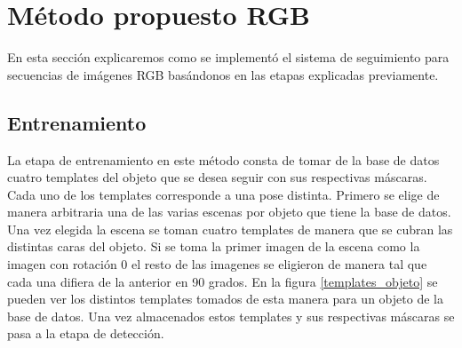 \section{Método propuesto RGB}\label{metodo_rgb}
En esta sección explicaremos como se implementó el sistema de seguimiento para secuencias de imágenes RGB basándonos en las etapas explicadas previamente.

\subsection{Entrenamiento}
La etapa de entrenamiento en este método consta de tomar de la base de datos cuatro templates del objeto que se desea seguir con sus respectivas máscaras. Cada uno de los templates corresponde a una pose distinta. Primero se elige de manera arbitraria una de las varias escenas por objeto que tiene la base de datos. Una vez elegida la escena se toman cuatro templates de manera que se cubran las distintas caras del objeto. Si se toma la primer imagen de la escena como la imagen con rotación 0 el resto de las imagenes se eligieron de manera tal que cada una difiera de la anterior en 90 grados. En la figura \ref{templates_objeto} se pueden ver los distintos templates tomados de esta manera para un objeto de la base de datos. Una vez almacenados estos templates y sus respectivas máscaras se pasa a la etapa de detección.

